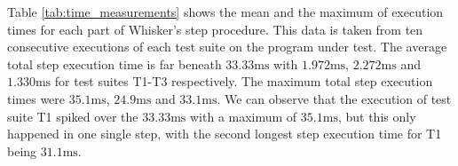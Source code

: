 \clearpage

Table \ref{tab:time_measurements} shows the mean and the maximum of execution times for each part of Whisker's step procedure.
This data is taken from ten consecutive executions of each test suite on the program under test.
The average total step execution time is far beneath $33.33\text{ms}$ with $1.972\text{ms}$, $2.272\text{ms}$ and $1.330\text{ms}$ for test suites T1-T3 respectively.
The maximum total step execution times were $35.1\text{ms}$, $24.9\text{ms}$ and $33.1\text{ms}$.
We can observe that the execution of test suite T1 spiked over the $33.33\text{ms}$ with a maximum of $35.1\text{ms}$,
but this only happened in one single step, with the second longest step execution time for T1 being $31.1\text{ms}$.

%

